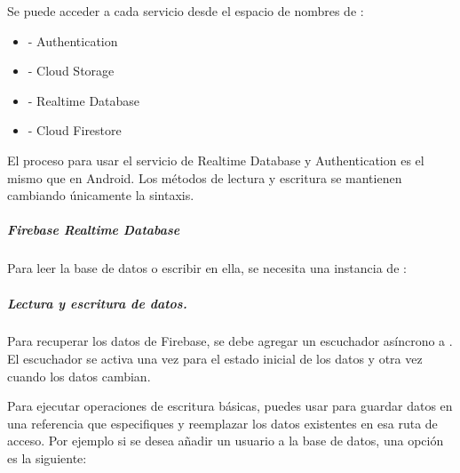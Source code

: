 Se puede acceder
a cada servicio desde el espacio de nombres de :
\begin{itemize}
\item {} 
 - Authentication

\item {} 
 - Cloud Storage

\item {} 
 - Realtime Database

\item {} 
 - Cloud Firestore

\end{itemize}

El proceso para usar el servicio de Realtime Database y Authentication
es el mismo que en Android. Los métodos de lectura y escritura
se mantienen cambiando únicamente la sintaxis.


\subparagraph{Firebase Realtime Database}
\label{\detokenize{firebase_web:firebase-realtime-database}}

Para leer la base de datos o escribir en ella, se necesita una instancia de
:

%
\begin{sphinxVerbatim}[commandchars=\\\{\}]
          
   
\end{sphinxVerbatim}


\subparagraph{Lectura y escritura de datos.}
\label{\detokenize{firebase_web:lectura-y-escritura-de-datos}}
Para recuperar los datos de Firebase, se debe agregar un escuchador
asíncrono a . El escuchador se activa una vez para
el estado inicial de los datos y otra vez cuando los datos cambian.


Para ejecutar operaciones de escritura básicas, puedes usar  para guardar
datos en una referencia que especifiques y reemplazar los datos existentes en
esa ruta de acceso. Por ejemplo si se desea añadir un usuario a la base de datos,
una opción es la siguiente:

